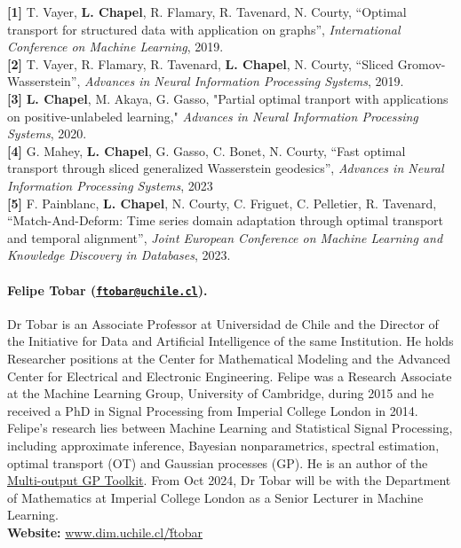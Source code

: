 \documentclass{article}
\begin{document}
\medskip%
\medskip%
\noindent\textbf{[1]} T. Vayer, \textbf{L. Chapel}, R. Flamary, R. Tavenard, N. Courty, “Optimal transport for structured data with application on graphs”, \emph{International Conference on Machine Learning}, 2019. \\
\textbf{[2]} T. Vayer, R. Flamary, R. Tavenard, \textbf{L. Chapel}, N. Courty, “Sliced Gromov-Wasserstein”, \emph{Advances in Neural Information Processing Systems}, 2019.  \\
\textbf{[3]} \textbf{L. Chapel}, M. Akaya, G. Gasso, "Partial optimal tranport with applications on positive-unlabeled learning," \emph{Advances in Neural Information Processing Systems}, 2020. \\
\textbf{[4]} G. Mahey, \textbf{L. Chapel}, G. Gasso, C. Bonet, N. Courty, “Fast optimal transport through sliced generalized Wasserstein geodesics”, \emph{Advances in Neural Information Processing Systems}, 2023
 \\
\textbf{[5]} F. Painblanc, \textbf{L. Chapel}, N. Courty, C. Friguet, C. Pelletier, R. Tavenard, “Match-And-Deform: Time series domain adaptation through optimal transport and temporal alignment”, \emph{Joint European Conference on Machine Learning and Knowledge Discovery in Databases}, 2023.





\paragraph{Felipe Tobar (\href{mailto:ftobar@uchile.cl}{\texttt{ftobar@uchile.cl}}).} Dr Tobar is an Associate Professor at Universidad de Chile and the Director of the Initiative for Data and Artificial Intelligence of the same Institution. He holds Researcher positions at the Center for Mathematical Modeling and the Advanced Center for Electrical and Electronic Engineering. Felipe was a Research Associate at the Machine Learning Group, University of Cambridge, during 2015 and he received a PhD in Signal Processing from Imperial College London in 2014. Felipe’s research lies between Machine Learning and Statistical Signal Processing, including approximate inference, Bayesian nonparametrics, spectral estimation, optimal transport (OT) and Gaussian processes (GP). He is an author of the \href{https://github.com/GAMES-UChile/mogptk}{Multi-output GP Toolkit}. From Oct 2024, Dr Tobar will be with the Department of Mathematics at Imperial College London as a Senior Lecturer in Machine Learning. \\
\textbf{Website:}  \href{https://www.dim.uchile.cl/~ftobar/}{www.dim.uchile.cl/\~ftobar}%
\end{document}
